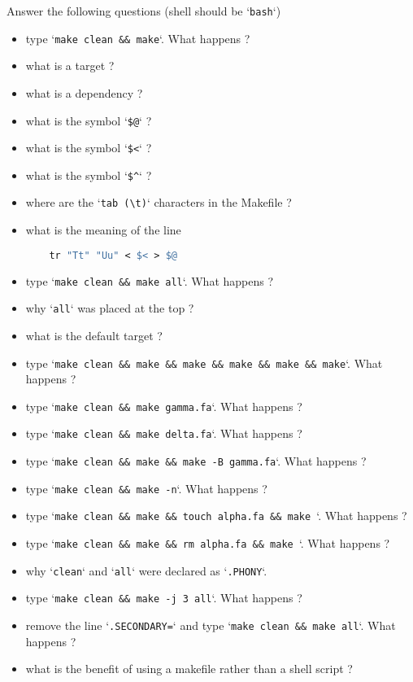 \documentclass{article}
\newcommand{\code}[1]{`\texttt{#1}`}
\begin{document}

Answer the following questions (shell should be \code{bash})
\begin{itemize}
\item type \code{make clean \&\& make}. What happens ?
\item what is a target ?
\item what is a dependency ?
\item what is the symbol  \code{\$@} ?
\item what is the symbol  \code{\$\textless} ?
\item what is the symbol  \code{\$\^} ?
\item where are the \code{tab (\textbackslash{}t)}  characters in the Makefile ?
\item what is the meaning of the line
\begin{lstlisting}[language=make]
%.rna:%.dna
	tr "Tt" "Uu" < $< > $@
\end{lstlisting}	
\item type \code{make clean \&\& make all}. What happens ?
\item why \code{all} was placed at the top ?
\item what is the default target ?
\item type \code{make clean \&\& make \&\& make \&\& make \&\& make \&\& make}. What happens ?
\item type \code{make clean \&\& make gamma.fa}. What happens ?
\item type \code{make clean \&\& make delta.fa}. What happens ?
\item type \code{make clean \&\& make \&\& make -B gamma.fa}. What happens ?
\item type \code{make clean \&\& make -n}. What happens ?
\item type \code{make clean \&\& make \&\& touch alpha.fa \&\& make }. What happens ?
\item type \code{make clean \&\& make \&\& rm alpha.fa \&\& make }. What happens ?
\item why \code{clean} and \code{all} were declared as \code{.PHONY}.
\item type \code{make clean \&\& make -j 3 all}. What happens ?
\item remove the line \code{.SECONDARY=} and type \code{make clean \&\& make all}. What happens ?
\item what is the benefit of using a makefile rather than a shell script ?
\end{itemize}
\end{document}
